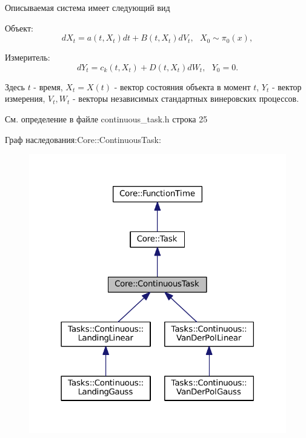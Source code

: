 Описываемая система имеет следующий вид


\begin{DoxyItemize}
\item Объект\+: \[dX_t = a(t, X_t)dt + B(t, X_t)dV_t,\ \ \ X_0 \sim \pi_0(x),\]
\item Измеритель\+: \[dY_t = c_k(t, X_t) + D(t, X_t)dW_t,\ \ \ Y_0 = 0.\]
\end{DoxyItemize}

Здесь $t$ -\/ время, $X_t = X(t)$ -\/ вектор состояния объекта в момент $t$, $Y_t$ -\/ вектор измерения, $V_t, W_t$ -\/ векторы независимых стандартных винеровских процессов. 

См. определение в файле continuous\+\_\+task.\+h строка 25



Граф наследования\+:Core\+:\+:Continuous\+Task\+:\nopagebreak
\begin{figure}[H]
\begin{center}
\leavevmode
\includegraphics[width=318pt]{class_core_1_1_continuous_task__inherit__graph}
\end{center}
\end{figure}


